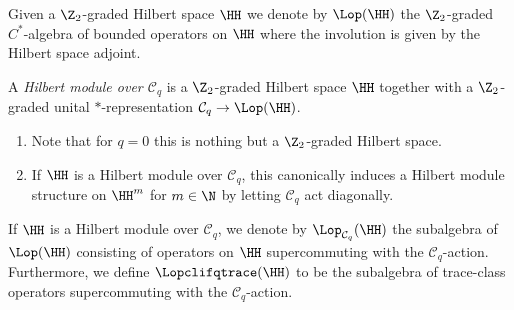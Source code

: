 \documentclass[a4paper, english, 12pt, bibliography=totocnumbered,
index=totoc]{scrartcl}
\begin{document}
Given a $\Z_2$-graded Hilbert space $\HH$ we denote by $\Lop(\HH)$ the
$\Z_2$-graded
$C^*$-algebra of bounded operators on $\HH$ where the involution is given by
the Hilbert space adjoint.
\begin{defn}
	A \textit{Hilbert module over $\mathcal{C}_q$} is a $\Z_2$-graded Hilbert
	space $\HH$
	together with a $\Z_2$-graded unital $*$-representation $\mathcal{C}_q \to
	\Lop(\HH)$.
\end{defn}
\begin{rem}
	\begin{enumerate}
		\item Note that for $q = 0$ this is nothing but a $\Z_2$-graded
		Hilbert space.
		\item If $\HH$ is a Hilbert module over $\mathcal{C}_q$, this
		canonically induces a Hilbert module structure on $\HH^m$ for $m \in
		\N$ by letting $\mathcal{C}_q$ act diagonally.
	\end{enumerate}
\end{rem}
\begin{nota}
	If $\HH$ is a Hilbert module over $\mathcal{C}_q$, we denote by
	$\Lop_{\mathcal{C}_q}(\HH)$ the subalgebra of $\Lop(\HH)$ consisting of
	operators on $\HH$ supercommuting with the $\mathcal{C}_q$-action.
	Furthermore, we define $\Lopclifqtrace(\HH)$ to be the subalgebra of
	trace-class operators supercommuting with the $\mathcal{C}_q$-action.
\end{nota}
\end{document}
